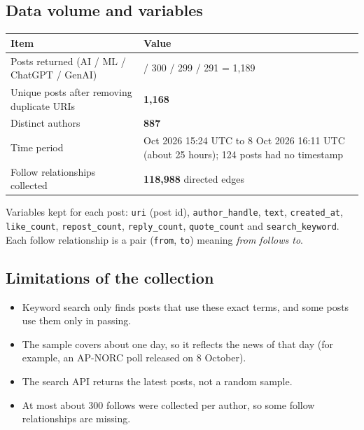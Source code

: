 \documentclass[
  10pt,
]{article}
\newcounter{none} %
\providecommand{\tightlist}{%
  \setlength{\itemsep}{0pt}\setlength{\parskip}{0pt}}
\begin{document}
\subsection{Data volume and variables}\label{data-volume-and-variables}

{\def\LTcaptype{none} %
\begin{longtable}[]{@{}
  >{\raggedright\arraybackslash}p{}
  >{\raggedright\arraybackslash}p{}@{}}
\toprule\noalign{}
\begin{minipage}[b]{\linewidth}\raggedright
Item
\end{minipage} & \begin{minipage}[b]{\linewidth}\raggedright
Value
\end{minipage} \\
\midrule\noalign{}
\endhead
\bottomrule\noalign{}
\endlastfoot
Posts returned (AI / ML / ChatGPT / GenAI) & 299 / 300 / 299 / 291 =
1,189 \\
Unique posts after removing duplicate URIs & \textbf{1,168} \\
Distinct authors & \textbf{887} \\
Time period & 7 Oct 2026 15:24 UTC to 8 Oct 2026 16:11 UTC (about 25
hours); 124 posts had no timestamp \\
Follow relationships collected & \textbf{118,988} directed edges \\
\end{longtable}
}

Variables kept for each post: \texttt{uri} (post id),
\texttt{author\_handle}, \texttt{text}, \texttt{created\_at},
\texttt{like\_count}, \texttt{repost\_count}, \texttt{reply\_count},
\texttt{quote\_count} and \texttt{search\_keyword}. Each follow
relationship is a pair (\texttt{from}, \texttt{to}) meaning \emph{from
follows to}.

\subsection{Limitations of the
collection}\label{limitations-of-the-collection}

\begin{itemize}
\tightlist
\item
  Keyword search only finds posts that use these exact terms, and some
  posts use them only in passing.
\item
  The sample covers about one day, so it reflects the news of that day
  (for example, an AP-NORC poll released on 8 October).
\item
  The search API returns the latest posts, not a random sample.
\item
  At most about 300 follows were collected per author, so some follow
  relationships are missing.
\end{itemize}
\end{document}
